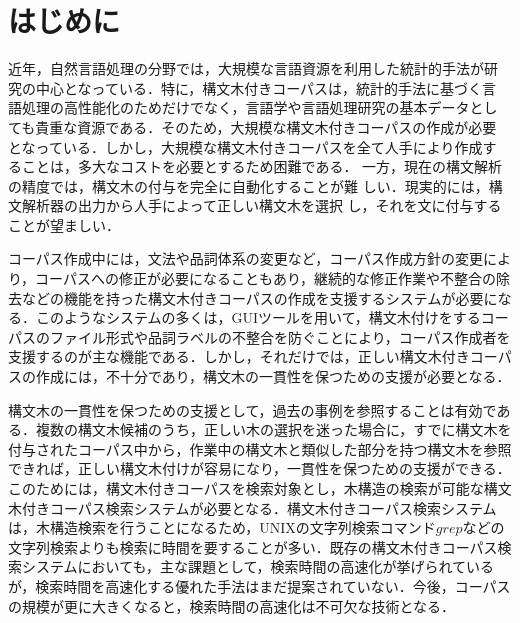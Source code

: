 \documentclass[japanese]{jnlp_1.3e}
\begin{document}
\maketitle



\section{はじめに}
\label{intro}

近年，自然言語処理の分野では，大規模な言語資源を利用した統計的手法が研
究の中心となっている．特に，構文木付きコーパスは，統計的手法に基づく言
語処理の高性能化のためだけでなく，言語学や言語処理研究の基本データとし
ても貴重な資源である．そのため，大規模な構文木付きコーパスの作成が必要
となっている．しかし，大規模な構文木付きコーパスを全て人手により作成す
ることは，多大なコストを必要とするため困難である．
一方，現在の構文解析の精度では，構文木の付与を完全に自動化することが難
しい．現実的には，構文解析器の出力から人手によって正しい構文木を選択
し，それを文に付与することが望ましい．

コーパス作成中には，文法や品詞体系の変更など，コーパス作成方針の変更により，コーパスへの修正が必要になることもあり，継続的な修正作業や不整合の除去などの機能を持った構文木付きコーパスの作成を支援するシステムが必要になる\cite{cunningham:2003:a}\cite{plaehn:2000:a}．このようなシステムの多くは，GUIツールを用いて，構文木付けをするコーパスのファイル形式や品詞ラベルの不整合を防ぐことにより，コーパス作成者を支援するのが主な機能である．しかし，それだけでは，正しい構文木付きコーパスの作成には，不十分であり，構文木の一貫性を保つための支援が必要となる．

構文木の一貫性を保つための支援として，過去の事例を参照することは有効である．複数の構文木候補のうち，正しい木の選択を迷った場合に，すでに構文木を付与されたコーパス中から，作業中の構文木と類似した部分を持つ構文木を参照できれば，正しい構文木付けが容易になり，一貫性を保つための支援ができる．このためには，構文木付きコーパスを検索対象とし，木構造の検索が可能な構文木付きコーパス検索システムが必要となる．構文木付きコーパス検索システムは，木構造検索を行うことになるため，UNIXの文字列検索コマンド$grep$などの文字列検索よりも検索に時間を要することが多い．既存の構文木付きコーパス検索システム\cite{randall:2000:a,rohde:2001:a,konig:2003:a,bird:2004:a}においても，主な課題として，検索時間の高速化が挙げられているが，検索時間を高速化する優れた手法はまだ提案されていない．今後，コーパスの規模が更に大きくなると，検索時間の高速化は不可欠な技術となる．
\end{document}
